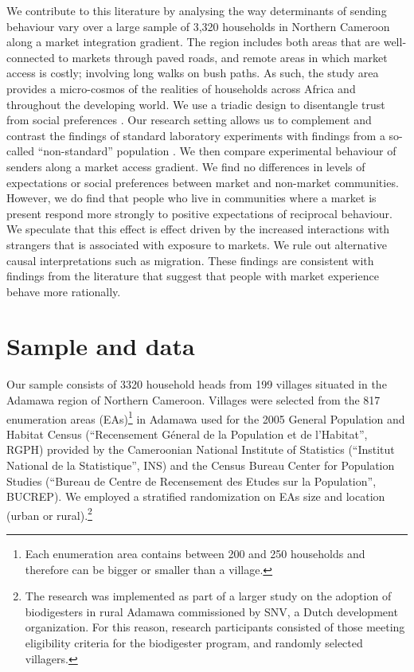 We contribute to this literature by analysing the way determinants of sending behaviour vary over a large sample of 3,320 households in Northern Cameroon along a market integration gradient. The region includes both areas that are well-connected to markets through paved roads, and remote areas in which market access is costly; involving long walks on bush paths. As such, the study area provides a micro-cosmos of the realities of households across Africa and throughout the developing world.  We use a triadic design to disentangle trust from social preferences \cite[following][]{Cox2004,Ashraf2006}. Our research setting allows us to complement and contrast the findings of standard laboratory experiments with findings from a so-called “non-standard” population \citep{Henrich2010a}. We then compare experimental behaviour of senders along a market access gradient. We find no differences in levels of expectations or social preferences between market and non-market communities. However, we do find that people who live in communities where a market is present respond more strongly to positive expectations of reciprocal behaviour. We speculate that this effect is effect driven by the increased interactions with strangers that is associated with exposure to markets. We rule out alternative causal interpretations such as migration. These findings are consistent with findings from the literature that suggest that people with market experience behave more rationally.


\section{Sample and data}



Our sample consists of 3320 household heads from 199 villages situated in the Adamawa region of Northern Cameroon. Villages were selected from the 817 enumeration areas (EAs)\footnote{Each enumeration area contains between 200 and 250 households and therefore can be bigger or smaller than a village.} in Adamawa used for the 2005 General Population and Habitat Census (``Recensement Géneral de la Population et de l’Habitat'', RGPH) provided by the Cameroonian National Institute of Statistics (``Institut National de la Statistique'', INS) and the Census Bureau Center for Population Studies (``Bureau de Centre de Recensement des Etudes sur la Population'', BUCREP). We employed a stratified randomization on EAs size and location (urban or rural).\footnote{The research was implemented as part of a larger study on the adoption of biodigesters in rural Adamawa commissioned by SNV, a Dutch development organization. For this reason, research participants consisted of those meeting eligibility criteria for the biodigester program, and randomly selected villagers.} 

